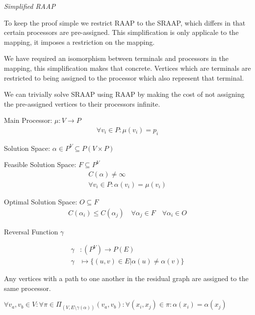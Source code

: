 \documentclass{article}
\begin{document}
\begin{definition}
{\em Simplified RAAP}

To keep the proof simple we restrict RAAP to the SRAAP, which differs in that certain processors are pre-assigned.
This simplification is only applicale to the mapping, it imposes a restriction on the mapping.

We have required an isomorphism between terminals and processors in the mapping, this simplification makes that concrete.
Vertices which are terminals are restricted to being assigned to the processor which also represent that terminal.

We can trivially solve SRAAP using RAAP by making the cost of not assigning the pre-assigned vertices to their processors infinite.

Main Processor: $\mu : V \rightarrow P$
\begin{align}
	\nonumber \forall v_i \in P : \mu(v_i) = p_i
\end{align}

Solution Space: $\alpha \in P^V \subseteq P(V \times P)$

Feasible Solution Space: $F \subseteq P^V$
\begin{align}
	\nonumber C(\alpha) \neq \infty \\
	\nonumber \forall v_i \in P : \alpha(v_i) = \mu(v_i)
\end{align}

Optimal Solution Space: $O \subseteq F$
\begin{align}
	\nonumber 	C(\alpha_i) \leq C(\alpha_j) \quad \forall \alpha_j \in F \quad \forall \alpha_i \in O
\end{align}

\end{definition}

\begin{definition}
Reversal Function $\gamma$

\begin{align}
	\nonumber \gamma & : (P^V) \rightarrow P(E) \\
	\nonumber \gamma & \mapsto \{(u,v) \in E | \alpha(u) \neq \alpha(v)\}
\end{align}
\end{definition}

\begin{lemma}
\label{PATHASSIGN}
Any vertices with a path to one another in the residual graph are assigned to the same processor.

$\forall v_a, v_b \in V : \forall \pi \in \Pi_{(V, E \setminus \gamma(\alpha))}(v_a, v_b) : \forall (x_i, x_j) \in \pi : \alpha(x_i) = \alpha(x_j)$
\end{lemma}
\end{document}
